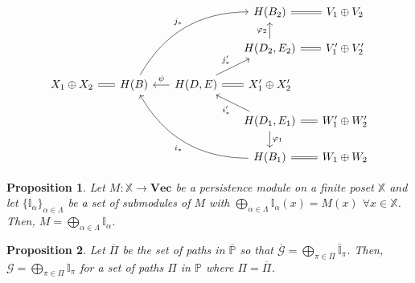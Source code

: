 \documentclass[10pt,a4paper]{amsart}
\newtheorem{proposition}{Proposition}
\newcommand{\VecSp}{\mathbf{Vec}}
\newcommand{\im}{\operatorname{im}}
\newcommand{\imapx}[1]{j_{#1\ast}}
\begin{document}
\begin{equation}\label{eq:lefschetz_ar_split_joint}
    \begin{tikzcd}[row sep=1.5em, column sep=1.5em]
        & & & H(B_2)\ar[r,equal]& V_1\oplus V_2\\
        & & & H(D_2, E_2)\arrow[u, "\varphi_2"]\ar[r,equal]& V_1'\oplus V_2'\\
        X_1\oplus X_2\ar[r, equal] & H(B) \arrow[rruu, bend left, "j_\ast"]\arrow[r,leftarrow, "\psi"]
            & H(D,E)\arrow[ru, "j_\ast'"] & \ar[l, equal]X_1'\oplus X_2' \\
        & & & H(D_1, E_1)\arrow[d, "\varphi_{1}"]\arrow[lu, "i_\ast'"]\ar[r,equal]& W_1'\oplus W_2'
            \\ %
        & & & H(B_1)\arrow[lluu, bend left, "i_\ast"] \ar[r,equal]& W_1\oplus W_2
    \end{tikzcd}
\end{equation}

\begin{proposition}
    Let $M:\mathbb X\rightarrow \VecSp$ be a persistence module on a finite
    poset $\mathbb X$ and let $\{\mathbb{I}_\alpha\}_{\alpha\in \Lambda}$ be a set of submodules of $M$ with
    $\bigoplus_{\alpha\in\Lambda}\mathbb{I}_\alpha(x)=M(x)$  $\forall x\in \mathbb{X}$.
    Then, $M=\bigoplus_{\alpha\in\Lambda} {\mathbb I}_\alpha$.
    \label{prop:composition}
\end{proposition}

\begin{proposition}
    Let $\overline\Pi$ be the set of paths in $\overline{\mathbb{P}}$ so that %
    $\overline{\mathcal G}=\bigoplus_{\pi\in \overline{\Pi}} \bar{\mathbb{I}}_{\pi}$.
    Then, ${\mathcal G}=\bigoplus_{\pi\in \Pi} \mathbb{I}_{\pi}$
    for a set of paths $\Pi$ in $\mathbb{P}$ where $\Pi=\overline{\Pi}$.
    \label{prop:CMmodule-simplified}
\end{proposition}
\end{document}
